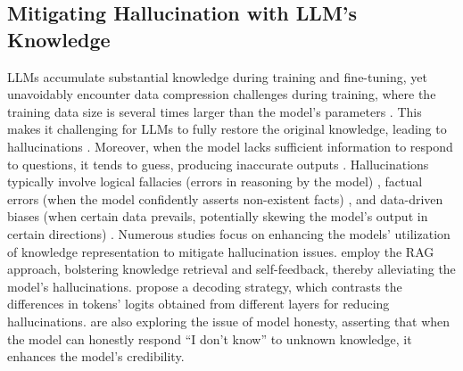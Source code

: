 \subsection{Mitigating Hallucination with LLM’s Knowledge}
LLMs accumulate substantial knowledge during training and fine-tuning, yet unavoidably encounter data compression challenges during training, where the training data size is several times larger than the model's parameters \citep{DBLP:journals/corr/abs-2308-07633}. This makes it challenging for LLMs to fully restore the original knowledge, leading to hallucinations \citep{gekhman2024does}. Moreover, when the model lacks sufficient information to respond to questions, it tends to guess, producing inaccurate outputs \citep{DBLP:conf/iclr/MundlerHJV24,DBLP:conf/icml/ZhangPMLS24}. Hallucinations typically involve logical fallacies (errors in reasoning by the model) \citep{DBLP:conf/iclr/Mu024}, factual errors (when the model confidently asserts non-existent facts) \citep{DBLP:conf/icml/Lv0C00024,DBLP:conf/acl/LiCRCZNW24}, and data-driven biases (when certain data prevails, potentially skewing the model's output in certain directions) \citep{DBLP:journals/corr/abs-2405-18654,DBLP:conf/acl/ZhangGLY24}. Numerous studies focus on enhancing the models' utilization of knowledge representation to mitigate hallucination issues. \citet{DBLP:conf/iclr/AsaiWWSH24,DBLP:conf/acl/NiuWZXSZS024} employ the RAG approach, bolstering knowledge retrieval and self-feedback, thereby alleviating the model's hallucinations. \citet{DBLP:conf/iclr/ChuangXLKGH24} propose a decoding strategy, which contrasts the differences in tokens’ logits obtained from different layers for reducing hallucinations. \citet{DBLP:conf/icml/ChengSLZYLLH0Q24,DBLP:conf/naacl/ZhangDLFL0CJZ24} are also exploring the issue of model honesty, asserting that when the model can honestly respond ``I don't know'' to unknown knowledge, it enhances the model's credibility.